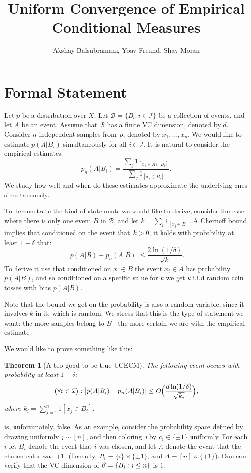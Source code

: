 \documentclass{article}
\title{Uniform Convergence of Empirical Conditional Measures}
\author{Akshay Balsubramani, Yoav Freund, Shay Moran}
\newtheorem{theorem}{Theorem}[section]
\newcommand{\B}{{\cal B}}
\newcommand{\cB}{\mathcal{B}}
\newcommand{\I}{\mathcal{I}}
\begin{document}
\maketitle

\section{Formal Statement}

Let $p$ be a distribution over $X$.
Let $\cB=\{B_i : i\in\I\}$ be a collection of events, and let $A$ be an event.
Assume that $\cB$ has a finite VC dimension, denoted by $d$.
Consider $n$ independent samples from~$p$, denoted by $x_1,\ldots,x_n$.
We would like to estimate $p(A \vert B_i)$ simultaneously for all $i\in \I$.
It is natural to consider the empirical estimates:
\[p_n(A\vert B_i)=\frac{\sum_j 1_{[x_j\in A \cap B_i]}}{\sum_j 1_{[x_j\in B_i]}}.\]
We study how well and when do these estimates approximate the underlying ones simultaneously.

To demonstrate the kind of statements we would like to derive,
consider the case where there is only one event $B$ in $\cB$, 
and let $k=\sum_j 1_{[x_j\in B]}$.
A Chernoff bound implies that conditioned on the event that~$k>0$, 
it holds with probability at least $1-\delta$ that:
\[\bigl\lvert p(A\vert B) - p_n(A \vert B) \bigr\rvert \leq \frac{2\ln(1/\delta)}{\sqrt{k}}.\]
To derive it use that conditioned on $x_i\in B$ the event $x_i\in A$ has probability $p(A\vert B)$, 
and so conditioned on a specific value for $k$ we get $k$ i.i.d random coin tosses with bias $p(A\vert B)$.

Note that the bound we get on the probability is also a random variable, 
since it involves $k$ in it, which is random.
We stress that this is the type of statement we want:
the more samples belong to $B$ | the more certain we are with the empirical estimate.

We would like to prove something like this:
\begin{theorem}[A too good to be true UCECM]\label{thm:toogood}
The following event occurs with probability at least $1-\delta$:
\[\bigl(\forall i\in\I\bigr):\bigl\lvert p(A \vert B_i) - p_n(A \vert B_i) \bigr\rvert \leq O\Bigl(\frac{d\ln(1/\delta)}{\sqrt{k_i}}\Bigr),\]
where $k_i = \sum_{j=1}^n 1[x_j\in B_i]$.
\end{theorem}
 is, unfortunately, false. 
As an example, consider the probability space defined by drawing uniformly $j\sim[n]$,
and then coloring $j$ by $c_j\in\{\pm 1\}$ uniformly.
For each $i$ let $B_i$ denote the event that $i$ was chosen,
and let $A$ denote the event that the chosen color was  $+1$.
(formally, $B_i = \{i\}\times\{\pm 1\}$, and $A=[n]\times\{+1\}$).
One can verify that the VC dimension of $\B=\{B_i : i\leq n\}$ is $1$.
\end{document}
